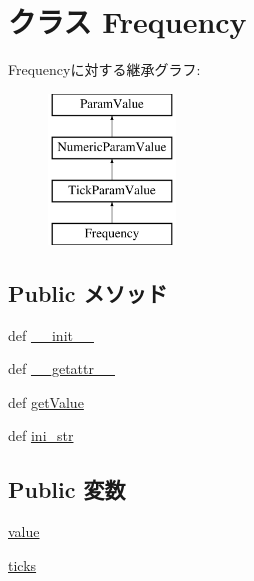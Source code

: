 \hypertarget{classm5_1_1params_1_1Frequency}{
\section{クラス Frequency}
\label{classm5_1_1params_1_1Frequency}
}
Frequencyに対する継承グラフ:\begin{figure}[H]
\begin{center}
\leavevmode
\includegraphics[height=4cm]{classm5_1_1params_1_1Frequency}
\end{center}
\end{figure}
\subsection*{Public メソッド}
\begin{DoxyCompactItemize}
\item 
def \hyperlink{classm5_1_1params_1_1Frequency_ac775ee34451fdfa742b318538164070e}{\_\-\_\-init\_\-\_\-}
\item 
def \hyperlink{classm5_1_1params_1_1Frequency_a0a990b3ec3889d40889daca9ee5e4695}{\_\-\_\-getattr\_\-\_\-}
\item 
def \hyperlink{classm5_1_1params_1_1Frequency_acc340fbd4335fa34f9d57fb454b28ed0}{getValue}
\item 
def \hyperlink{classm5_1_1params_1_1Frequency_a33ebe6cd32bcbd15465fc28b9d94bf82}{ini\_\-str}
\end{DoxyCompactItemize}
\subsection*{Public 変数}
\begin{DoxyCompactItemize}
\item 
\hyperlink{classm5_1_1params_1_1Frequency_afcc7a4b78ecd8fa7e713f8cfa0f51017}{value}
\item 
\hyperlink{classm5_1_1params_1_1Frequency_a278a1f181e2be02613530daeaa8afdab}{ticks}
\end{DoxyCompactItemize}


